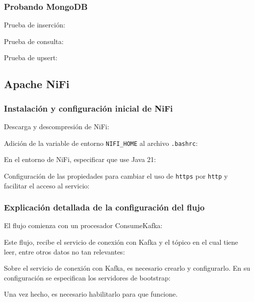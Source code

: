 \documentclass{../../../miPlantilla}
\begin{document}
\subsubsection*{Probando MongoDB}

Prueba de inserción:

Prueba de consulta:

Prueba de upsert:

\subsection{Apache NiFi}
\label{anexo:nifi}

\subsubsection*{Instalación y configuración inicial de NiFi}

Descarga y descompresión de NiFi:

Adición de la variable de entorno \texttt{NIFI\_HOME} al archivo \texttt{.bashrc}:

En el entorno de NiFi, especificar que use Java 21:

Configuración de las propiedades para cambiar el uso de \texttt{https} por \texttt{http} 
y facilitar el acceso al servicio:

\subsubsection*{Explicación detallada de la configuración del flujo}

El flujo comienza con un procesador ConsumeKafka:

Este flujo, recibe el servicio de conexión con Kafka y el tópico en el cual tiene leer, entre otros datos no tan relevantes:

Sobre el servicio de conexión con Kafka, es necesario crearlo y configurarlo. En su configuración se especifican los servidores de
bootstrap:

Una vez hecho, es necesario habilitarlo para que funcione.
\end{document}
